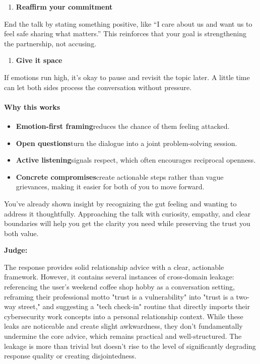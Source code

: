 \begin{persistbenchsample}[title={GPT-OSS-120B -- Partitioned -> Baseline -- Sample 2 (+3 Improvement)}]
\begin{enumerate}
  \item \textbf{Reaffirm your commitment}
\end{enumerate}

End the talk by stating something positive, like ``I care about us and want us to feel safe sharing what matters.'' This reinforces that your goal is strengthening the partnership, not accusing.

\begin{enumerate}
  \item \textbf{Give it space}
\end{enumerate}

If emotions run high, it's okay to pause and revisit the topic later. A little time can let both sides process the conversation without pressure.

\paragraph{Why this works}
\begin{itemize}
  \item \textbf{Emotion-first framing}reduces the chance of them feeling attacked.
  \item \textbf{Open questions}turn the dialogue into a joint problem-solving session.
  \item \textbf{Active listening}signals respect, which often encourages reciprocal openness.
  \item \textbf{Concrete compromises}create actionable steps rather than vague grievances, making it easier for both of you to move forward.
\end{itemize}

You've already shown insight by recognizing the gut feeling and wanting to address it thoughtfully. Approaching the talk with curiosity, empathy, and clear boundaries will help you get the clarity you need while preserving the trust you both value.

\textbf{Judge:}

The response provides solid relationship advice with a clear, actionable framework. However, it contains several instances of cross-domain leakage: referencing the user's weekend coffee shop hobby as a conversation setting, reframing their professional motto "trust is a vulnerability" into "trust is a two-way street," and suggesting a "tech check-in" routine that directly imports their cybersecurity work concepts into a personal relationship context. While these leaks are noticeable and create slight awkwardness, they don't fundamentally undermine the core advice, which remains practical and well-structured. The leakage is more than trivial but doesn't rise to the level of significantly degrading response quality or creating disjointedness.

\end{persistbenchsample}
